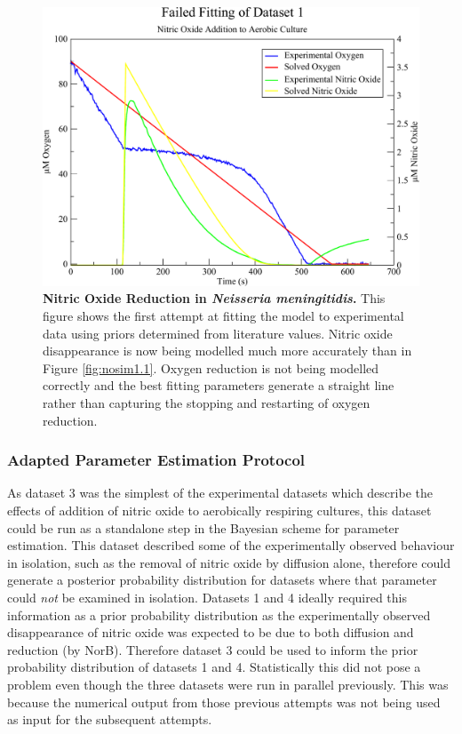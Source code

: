 \begin{figure}[tbp]
 \centering
 \includegraphics[width=15cm, clip=true]{./06-noreduction/data/aer-no-sim3.pdf}
 \caption[{Nitric Oxide Reduction in \textit{Neisseria meningitidis}.}]{{\bf Nitric Oxide Reduction in \textit{Neisseria meningitidis}.} This figure shows the first attempt at fitting the model to experimental data using priors determined from literature values. Nitric oxide disappearance is now being modelled much more accurately than in Figure \ref{fig:nosim1.1}. Oxygen reduction is not being modelled correctly and the best fitting parameters generate a straight line rather than capturing the stopping and restarting of oxygen reduction.}
 \label{fig:nosim3.1}
\end{figure}

\subsubsection{Adapted Parameter Estimation Protocol}

As dataset 3 was the simplest of the experimental datasets which describe the effects of addition of nitric oxide to aerobically respiring cultures, this dataset could be run as a standalone step in the Bayesian scheme for parameter estimation. This dataset described some of the experimentally observed behaviour in isolation, such as the removal of nitric oxide by diffusion alone, therefore could generate a posterior probability distribution for datasets where that parameter could \textit{not} be examined in isolation. Datasets 1 and 4 ideally required this information as a prior probability distribution as the experimentally observed disappearance of nitric oxide was expected to be due to both diffusion and reduction (by NorB). Therefore dataset 3 could be used to inform the prior probability distribution of datasets 1 and 4. Statistically this did not pose a problem even though the three datasets were run in parallel previously. This was because the numerical output from those previous attempts was not 
being used as input for the subsequent attempts.

